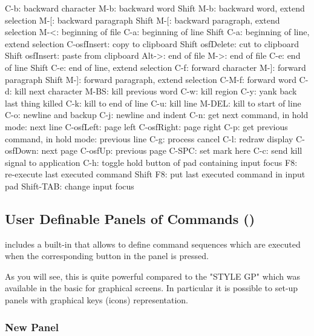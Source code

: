 \begin{XMP}
C-b:              backward character
M-b:              backward word
Shift M-b:        backward word, extend selection
M-[:              backward paragraph
Shift M-[:        backward paragraph, extend selection
M-<:              beginning of file
C-a:              beginning of line
Shift C-a:        beginning of line, extend selection
C-osfInsert:      copy to clipboard
Shift osfDelete:  cut to clipboard
Shift osfInsert:  paste from clipboard
Alt->:            end of file
M->:              end of file
C-e:              end of line
Shift C-e:        end of line, extend selection
C-f:              forward character
M-]:              forward paragraph
Shift M-]:        forward paragraph, extend selection
C-M-f:            forward word
C-d:              kill next character
M-BS:             kill previous word
C-w:              kill region
C-y:              yank back last thing killed
C-k:              kill to end of line
C-u:              kill line
M-DEL:            kill to start of line
C-o:              newline and backup
C-j:              newline and indent
C-n:              get next command, in hold mode: next line
C-osfLeft:        page left
C-osfRight:       page right
C-p:              get previous command, in hold mode: previous line
C-g:              process cancel
C-l:              redraw display
C-osfDown:        next page
C-osfUp:          previous page
C-SPC:            set mark here
C-c:              send kill signal to application
C-h:              toggle hold button of pad containing input focus
F8:               re-execute last executed command
Shift F8:         put last executed command in input pad
Shift-TAB:        change input focus
\end{XMP}


\subsection{User Definable Panels of Commands (\PNI{})}
\label{ref:repanel}

\KUIPMotif{} includes a built-in \PNI{} that allows to define
command sequences which are executed when the corresponding button
in the panel is pressed.
 
As you will see, this \PNI{} is quite powerful compared to the "STYLE GP"
which was available in the basic \KUIP{} for graphical screens.
In particular it is possible
to set-up panels with graphical keys (icons) representation.
 
\subsubsection{New Panel}

